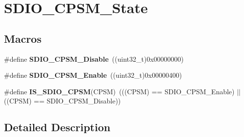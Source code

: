 \hypertarget{group___s_d_i_o___c_p_s_m___state}{}\section{S\+D\+I\+O\+\_\+\+C\+P\+S\+M\+\_\+\+State}
\label{group___s_d_i_o___c_p_s_m___state}
\subsection*{Macros}
\begin{DoxyCompactItemize}
\item 
\hypertarget{group___s_d_i_o___c_p_s_m___state_ga996751273ad238e255a740f7c2844c6c}{}\#define {\bfseries S\+D\+I\+O\+\_\+\+C\+P\+S\+M\+\_\+\+Disable}~((uint32\+\_\+t)0x00000000)\label{group___s_d_i_o___c_p_s_m___state_ga996751273ad238e255a740f7c2844c6c}

\item 
\hypertarget{group___s_d_i_o___c_p_s_m___state_gad437cefe89d6175aa074a1c40b909ebc}{}\#define {\bfseries S\+D\+I\+O\+\_\+\+C\+P\+S\+M\+\_\+\+Enable}~((uint32\+\_\+t)0x00000400)\label{group___s_d_i_o___c_p_s_m___state_gad437cefe89d6175aa074a1c40b909ebc}

\item 
\hypertarget{group___s_d_i_o___c_p_s_m___state_ga58cf04903dab015106e4e0937bef443b}{}\#define {\bfseries I\+S\+\_\+\+S\+D\+I\+O\+\_\+\+C\+P\+S\+M}(C\+P\+S\+M)~(((C\+P\+S\+M) == S\+D\+I\+O\+\_\+\+C\+P\+S\+M\+\_\+\+Enable) $\vert$$\vert$ ((C\+P\+S\+M) == S\+D\+I\+O\+\_\+\+C\+P\+S\+M\+\_\+\+Disable))\label{group___s_d_i_o___c_p_s_m___state_ga58cf04903dab015106e4e0937bef443b}

\end{DoxyCompactItemize}


\subsection{Detailed Description}
